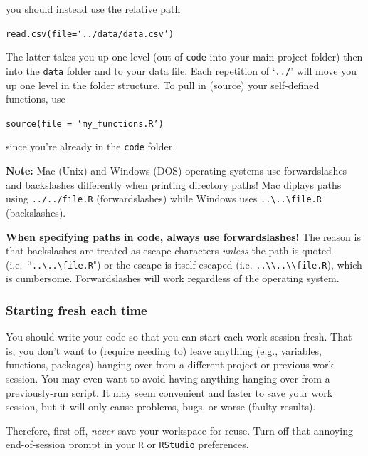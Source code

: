 \documentclass[12pt,letterpaper]{article}
\begin{document}
\noindent
you should instead use the relative path

\texttt{read.csv(file=`../data/data.csv')}

\noindent
The latter takes you up one level (out of \texttt{code} into your main project 
folder) then into the \texttt{data} folder and to your data file.
Each repetition of `\texttt{../}' will move you up one level in the folder structure.
To pull in (source) your self-defined functions, use

\texttt{source(file = `my\_functions.R')}

\noindent
since you're already in the \texttt{code} folder.

\begin{tcolorbox}[breakable, enhanced, before upper={\parindent15pt}]
	\noindent
\textbf{Note:} 
Mac (Unix) and Windows (DOS) operating systems use forwardslashes and backslashes differently when printing directory paths!  
Mac diplays paths using \texttt{../../file.R} (forwardslashes) while Windows uses 
\texttt{..\textbackslash..\textbackslash file.R} (backslashes).

{\centering
\textbf{When specifying paths in code, always use forwardslashes!}
}
The reason is that backslashes are treated as escape characters \textit{unless} the path is quoted (i.e.~``\texttt{..\textbackslash..\textbackslash file.R}") or the escape is itself escaped
(i.e. \texttt{..\textbackslash \textbackslash..\textbackslash \textbackslash file.R}),
which is cumbersome.
Forwardslashes will work regardless of the operating system.


\end{tcolorbox}

\subsubsection{Starting fresh each time}


You should write your code so that you can start each work session fresh.
That is, you don't want to (require needing to) leave anything (e.g., variables, functions, packages) 
hanging over from a different project or previous work session.
You may even want to avoid having anything hanging over from a previously-run script.
It may seem convenient and faster to save your work session, but it will only cause problems, bugs, 
or worse (faulty results).

Therefore, first off, \emph{never} save your workspace for reuse.
Turn off that annoying end-of-session prompt in your \texttt{R} or \texttt{RStudio} preferences.
\end{document}
